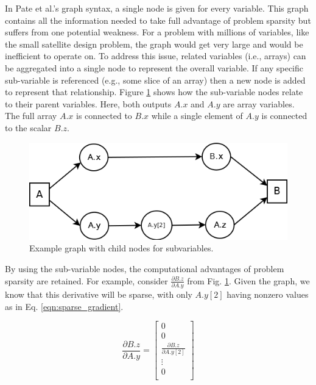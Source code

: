 \documentclass[]{aiaa-tc} %
\begin{document}
    In Pate et al.'s graph syntax, a single node is given for every variable. This graph contains all the
    information needed to take full advantage of problem sparsity but suffers from one potential
    weakness. For a problem with millions of  variables, like the small satellite design problem,
    the graph would get very large and would be inefficient to operate on. To address this issue,
    related variables (i.e., arrays) can be aggregated into a single node to represent the
    overall variable. If any specific sub-variable is referenced (e.g., some slice of an array) 
    then a new node is added to represent that relationship.
    Figure \ref{fig:subvars} shows how the sub-variable nodes relate to their parent variables. Here,
    both outputs $A.x$ and $A.y$ are array variables. The full array $A.x$ is connected to
    $B.x$ while a single element of $A.y$ is connected to the scalar $B.z$.

    \begin{figure}[!htb]\begin{center}
      \includegraphics[width=.8\textwidth]{images/Graph1}
      \caption{ Example graph with child nodes for subvariables. \label{fig:subvars}}
    \end{center}\end{figure}

    By using the sub-variable nodes, the computational advantages of problem sparsity are retained. For example,
    consider $\frac{\partial B.z}{\partial A.y}$ from Fig. \ref{fig:subvars}. Given the graph, we know that
    this derivative will be sparse, with only $A.y[2]$ having nonzero values as in Eq.  \ref{eqn:sparse_gradient}.

    \begin{equation}
        \frac{\partial B.z}{\partial A.y} =
        \begin{bmatrix}
            0 \\
            0 \\
            \frac{\partial B.z}{\partial A.y[2]} \\
            \vdots \\
            0 \\
        \end{bmatrix}
        \label{eqn:sparse_gradient}
    \end{equation}
\end{document}
